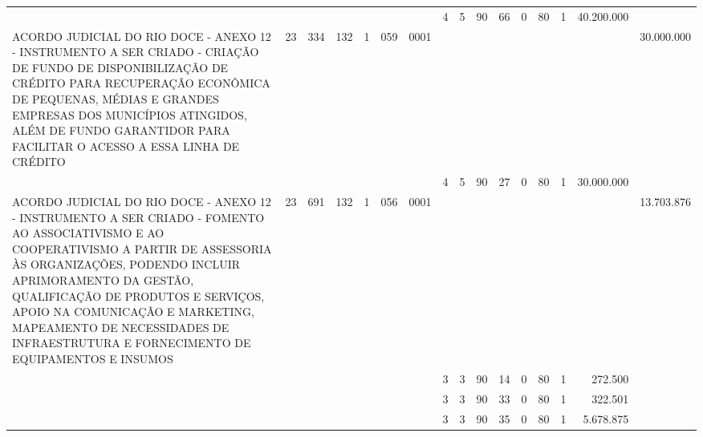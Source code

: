 \documentclass{article}
\begin{document}
\begin{longtable}[c]{m{6.5cm}|m{1pt}m{1pt}m{1pt}m{1pt}m{1pt}m{1pt}|m{1pt}m{1pt}m{0.5pt}m{1pt}|m{1pt}|m{1pt}m{1pt}|m{1pt}|m{2pt}}
& & & & & & & \multicolumn{1}{c}{ 4 } & \multicolumn{1}{c}{ 5 } & \multicolumn{1}{c}{ 90 } & \multicolumn{1}{c|}{ 66 } & \multicolumn{1}{c|}{ 0 } & \multicolumn{1}{l}{ 80 } & \multicolumn{1}{c|}{ 1 } & \multicolumn{1}{r|}{ 40.200.000 } & \\
\multicolumn{1}{L{5.5cm}|}{ ACORDO JUDICIAL DO RIO DOCE - ANEXO 12 - INSTRUMENTO A SER CRIADO - CRIAÇÃO DE FUNDO DE DISPONIBILIZAÇÃO DE CRÉDITO PARA RECUPERAÇÃO ECONÔMICA DE PEQUENAS, MÉDIAS E GRANDES EMPRESAS DOS MUNICÍPIOS ATINGIDOS, ALÉM DE FUNDO GARANTIDOR PARA FACILITAR O ACESSO A ESSA LINHA DE CRÉDITO } & \multicolumn{1}{c}{ 23 } & \multicolumn{1}{c}{ 334 } & \multicolumn{1}{c}{ 132 } & \multicolumn{1}{l}{ 1 } & \multicolumn{1}{c}{ 059 } & \multicolumn{1}{l|}{ 0001 } & & & & & & & & & \multicolumn{1}{r}{ 30.000.000 } \\
& & & & & & & \multicolumn{1}{c}{ 4 } & \multicolumn{1}{c}{ 5 } & \multicolumn{1}{c}{ 90 } & \multicolumn{1}{c|}{ 27 } & \multicolumn{1}{c|}{ 0 } & \multicolumn{1}{l}{ 80 } & \multicolumn{1}{c|}{ 1 } & \multicolumn{1}{r|}{ 30.000.000 } & \\
\multicolumn{1}{L{5.5cm}|}{ ACORDO JUDICIAL DO RIO DOCE - ANEXO 12 - INSTRUMENTO A SER CRIADO - FOMENTO AO ASSOCIATIVISMO E AO COOPERATIVISMO A PARTIR DE ASSESSORIA ÀS ORGANIZAÇÕES, PODENDO INCLUIR APRIMORAMENTO DA GESTÃO, QUALIFICAÇÃO DE PRODUTOS E SERVIÇOS, APOIO NA COMUNICAÇÃO E MARKETING, MAPEAMENTO DE NECESSIDADES DE INFRAESTRUTURA E FORNECIMENTO DE EQUIPAMENTOS E INSUMOS } & \multicolumn{1}{c}{ 23 } & \multicolumn{1}{c}{ 691 } & \multicolumn{1}{c}{ 132 } & \multicolumn{1}{l}{ 1 } & \multicolumn{1}{c}{ 056 } & \multicolumn{1}{l|}{ 0001 } & & & & & & & & & \multicolumn{1}{r}{ 13.703.876 } \\
& & & & & & & \multicolumn{1}{c}{ 3 } & \multicolumn{1}{c}{ 3 } & \multicolumn{1}{c}{ 90 } & \multicolumn{1}{c|}{ 14 } & \multicolumn{1}{c|}{ 0 } & \multicolumn{1}{l}{ 80 } & \multicolumn{1}{c|}{ 1 } & \multicolumn{1}{r|}{ 272.500 } & \\
& & & & & & & \multicolumn{1}{c}{ 3 } & \multicolumn{1}{c}{ 3 } & \multicolumn{1}{c}{ 90 } & \multicolumn{1}{c|}{ 33 } & \multicolumn{1}{c|}{ 0 } & \multicolumn{1}{l}{ 80 } & \multicolumn{1}{c|}{ 1 } & \multicolumn{1}{r|}{ 322.501 } & \\
& & & & & & & \multicolumn{1}{c}{ 3 } & \multicolumn{1}{c}{ 3 } & \multicolumn{1}{c}{ 90 } & \multicolumn{1}{c|}{ 35 } & \multicolumn{1}{c|}{ 0 } & \multicolumn{1}{l}{ 80 } & \multicolumn{1}{c|}{ 1 } & \multicolumn{1}{r|}{ 5.678.875 } & \\

\end{longtable}
\end{document}
